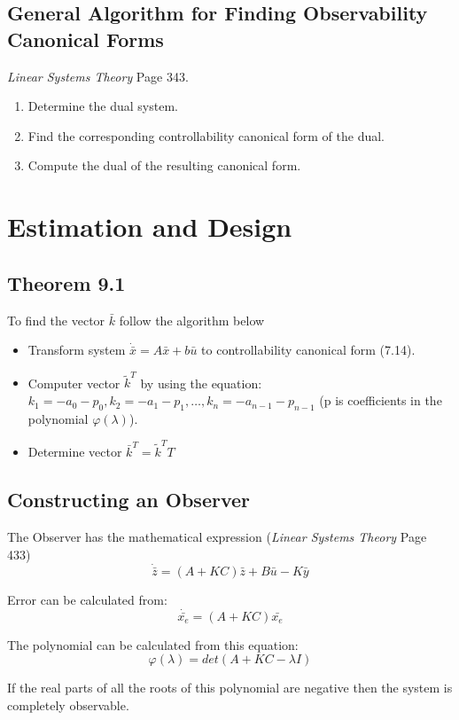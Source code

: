 \documentclass[12pt]{article}
\begin{document}
\subsection*{General Algorithm for Finding Observability Canonical Forms}
{\em Linear Systems Theory} Page 343.
\begin{enumerate}
	\item Determine the dual system.
	\item Find the corresponding controllability canonical form of the dual.
	\item Compute the dual of the resulting canonical form.
\end{enumerate}

\newpage
\section*{Estimation and Design}
\subsection*{Theorem 9.1}
To find the vector $\bar{k}$ follow the algorithm below
\begin{itemize}
	\item Transform system $\dot{\bar{x}}=A\bar{x}+b\bar{u}$ to controllability canonical form (7.14).
	\item Computer vector $\tilde{k}^T$ by using the equation: $k_1=-a_0-p_0, k_2=-a_1-p_1, \dots, k_n=-a_{n-1}-p_{n-1}$ (p is coefficients in the polynomial $\varphi(\lambda)$).
	\item Determine vector $\bar{k}^T=\tilde{k}^TT$
\end{itemize}

\subsection*{Constructing an Observer}
The Observer has the mathematical expression ({\em Linear Systems Theory} Page 433)
$$\dot{\bar{z}}=(A+KC)\bar{z}+B\bar{u}-K\bar{y}$$

\noindent
Error can be calculated from:
$$\dot{\bar{x_e}}=(A+KC)\bar{x_e}$$

\noindent
The polynomial can be calculated from this equation:
$$\varphi(\lambda)=det(A+KC-\lambda I)$$

\noindent
If the real parts of all the roots of this polynomial are negative then the system is completely observable. 
\end{document}
